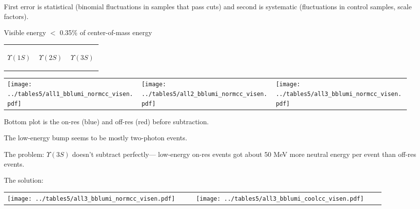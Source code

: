 \documentclass[landscape]{article}
\begin{document}
\vspace{-0.75 cm}
First error is statistical (binomial fluctuations in samples that pass
cuts) and second is systematic (fluctuations in control samples, scale factors).

\pagebreak

Visible energy $<$ 0.35\% of center-of-mass energy

\vspace{-1.75 cm}
\begin{center}
  \begin{tabular}{p{0.32\linewidth} p{0.32\linewidth} p{0.32\linewidth}}
    \begin{center} $\Upsilon(1S)$ \end{center} & \begin{center} $\Upsilon(2S)$ \end{center} & \begin{center} $\Upsilon(3S)$ \end{center} \\
  \end{tabular}

  \vspace{-0.75 cm}
  \begin{tabular}{p{0.32\linewidth} p{0.32\linewidth} p{0.32\linewidth}}
    \texttt{[image: ../tables5/all1\_bblumi\_normcc\_visen.pdf]} &
    \texttt{[image: ../tables5/all2\_bblumi\_normcc\_visen.pdf]} &
    \texttt{[image: ../tables5/all3\_bblumi\_normcc\_visen.pdf]}
  \end{tabular}
\end{center}

\vfill

Bottom plot is the on-res (blue) and off-res (red) before subtraction.

\vfill

The low-energy bump seems to be mostly two-photon events.

\vfill

The problem: $\Upsilon(3S)$ doesn't subtract perfectly--- low-energy
on-res events got about 50 MeV more neutral energy per event than
off-res events.

\vfill

\pagebreak

The solution:

\vspace{0.5 cm}
\begin{tabular}{p{0.45\linewidth} p{0.45\linewidth}}
  \texttt{[image: ../tables5/all3\_bblumi\_normcc\_visen.pdf]} &
  \texttt{[image: ../tables5/all3\_bblumi\_coolcc\_visen.pdf]}
\end{tabular}
\end{document}
